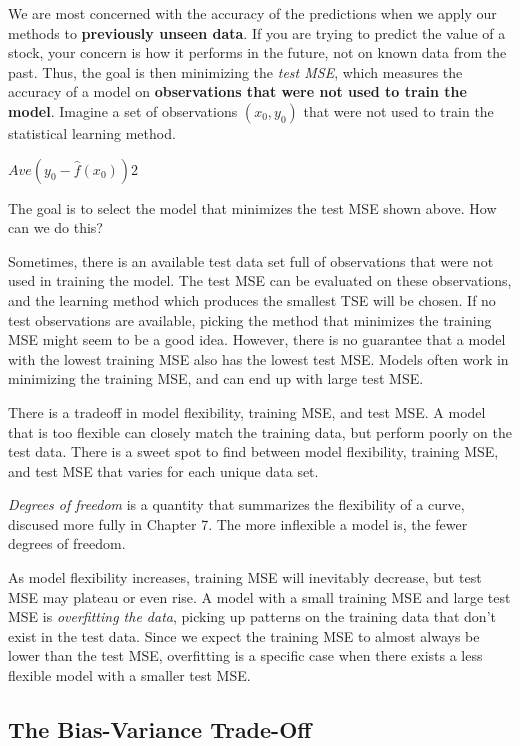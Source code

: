 \documentclass[]{book}
\theoremstyle{definition}
\theoremstyle{definition}
\theoremstyle{definition}
\theoremstyle{remark}
\begin{document}
We are most concerned with the accuracy of the predictions when we apply
our methods to \textbf{previously unseen data}. If you are trying to
predict the value of a stock, your concern is how it performs in the
future, not on known data from the past. Thus, the goal is then
minimizing the \emph{test MSE}, which measures the accuracy of a model
on \textbf{observations that were not used to train the model}. Imagine
a set of observations \((x_0, y_0)\) that were not used to train the
statistical learning method.

\(Ave(y_0 - \hat{f}(x_0))2\)

The goal is to select the model that minimizes the test MSE shown above.
How can we do this?

Sometimes, there is an available test data set full of observations that
were not used in training the model. The test MSE can be evaluated on
these observations, and the learning method which produces the smallest
TSE will be chosen. If no test observations are available, picking the
method that minimizes the training MSE might seem to be a good idea.
However, there is no guarantee that a model with the lowest training MSE
also has the lowest test MSE. Models often work in minimizing the
training MSE, and can end up with large test MSE.

There is a tradeoff in model flexibility, training MSE, and test MSE. A
model that is too flexible can closely match the training data, but
perform poorly on the test data. There is a sweet spot to find between
model flexibility, training MSE, and test MSE that varies for each
unique data set.

\emph{Degrees of freedom} is a quantity that summarizes the flexibility
of a curve, discused more fully in Chapter 7. The more inflexible a
model is, the fewer degrees of freedom.

As model flexibility increases, training MSE will inevitably decrease,
but test MSE may plateau or even rise. A model with a small training MSE
and large test MSE is \emph{overfitting the data}, picking up patterns
on the training data that don't exist in the test data. Since we expect
the training MSE to almost always be lower than the test MSE,
overfitting is a specific case when there exists a less flexible model
with a smaller test MSE.

\subsection{The Bias-Variance
Trade-Off}\label{the-bias-variance-trade-off}
\end{document}
